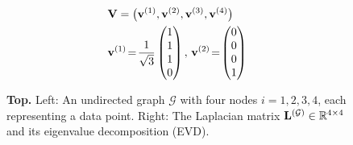 {{\begin{figure}[H]
\begin{center}
\begin{minipage}{0.4\textwidth}
\begin{equation}
					\end{equation} 
				\end{minipage}
				\vspace*{20mm}\\
				  \begin{minipage}{0.4\textwidth}
				\end{minipage} 
    		\begin{minipage}{0.4\textwidth}
										\begin{align}
											& \mathbf{V} = \big( {\bf v}^{(1)},{\bf v}^{(2)},{\bf v}^{(3)},{\bf v}^{(4)} \big) \nonumber \\
											&	\mathbf{v}^{(1)}\!=\!\frac{1}{\sqrt{3}} \begin{pmatrix} 1 \\ 1 \\ 1 \\ 0 \end{pmatrix}, \,
												\mathbf{v}^{(2)}\!=\!\begin{pmatrix} 0 \\ 0 \\ 0 \\ 1 \end{pmatrix} \nonumber 
												\end{align}
				\end{minipage} 
				\caption{\label{fig_lap_mtx_specclustering_dict} {\bf Top.} Left: An undirected graph 
					$\mathcal{G}$ with four nodes $i=1,2,3,4$, each representing a data point. Right: The Laplacian matrix 
					${\bf L}^{(\mathcal{G})}  \in \mathbb{R}^{4 \times 4}$ and its eigenvalue decomposition (EVD). 
}
\end{center}
\end{figure}}}
